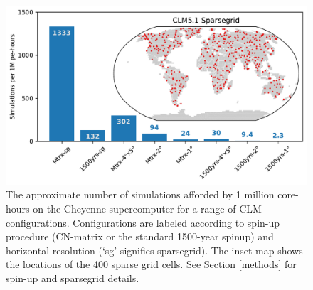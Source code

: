 \documentclass[draft]{agujournal2019}
\begin{document}
\begin{figure}[h]
\centering
\includegraphics[width=30pc]{../figs/sims.pdf}
\caption{The approximate number of simulations afforded by 1 million core-hours on the Cheyenne supercomputer for a range of CLM configurations. Configurations are labeled according to spin-up procedure (CN-matrix or the standard 1500-year spinup) and horizontal resolution (`sg' signifies sparsegrid). The inset map shows the locations of the 400 sparse grid cells. See Section \ref{methods} for spin-up and sparsegrid details.}
\label{fig:sims}
\end{figure}
\end{document}
